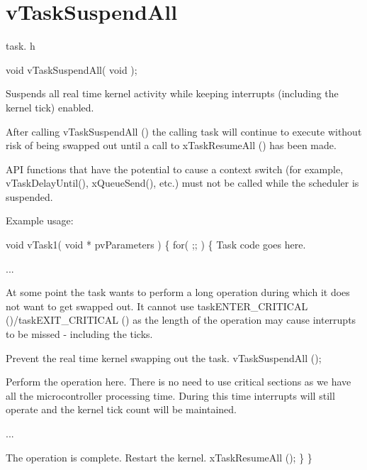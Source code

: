 \hypertarget{group__v_task_suspend_all}{\section{v\-Task\-Suspend\-All}
\label{group__v_task_suspend_all}
}
task. h 
\begin{DoxyPre}void vTaskSuspendAll( void );\end{DoxyPre}


Suspends all real time kernel activity while keeping interrupts (including the kernel tick) enabled.

After calling v\-Task\-Suspend\-All () the calling task will continue to execute without risk of being swapped out until a call to x\-Task\-Resume\-All () has been made.

A\-P\-I functions that have the potential to cause a context switch (for example, v\-Task\-Delay\-Until(), x\-Queue\-Send(), etc.) must not be called while the scheduler is suspended.

Example usage\-: 
\begin{DoxyPre}
 void vTask1( void * pvParameters )
 \{
         for( ;; )
         \{
Task code goes here.\end{DoxyPre}



\begin{DoxyPre}...\end{DoxyPre}



\begin{DoxyPre}At some point the task wants to perform a long operation during
which it does not want to get swapped out.  It cannot use
taskENTER\_CRITICAL ()/taskEXIT\_CRITICAL () as the length of the
operation may cause interrupts to be missed - including the
ticks.\end{DoxyPre}



\begin{DoxyPre}Prevent the real time kernel swapping out the task.
                 vTaskSuspendAll ();\end{DoxyPre}



\begin{DoxyPre}Perform the operation here.  There is no need to use critical
sections as we have all the microcontroller processing time.
During this time interrupts will still operate and the kernel
tick count will be maintained.\end{DoxyPre}



\begin{DoxyPre}...\end{DoxyPre}



\begin{DoxyPre}The operation is complete.  Restart the kernel.
                 xTaskResumeAll ();
         \}
 \}
   \end{DoxyPre}
 